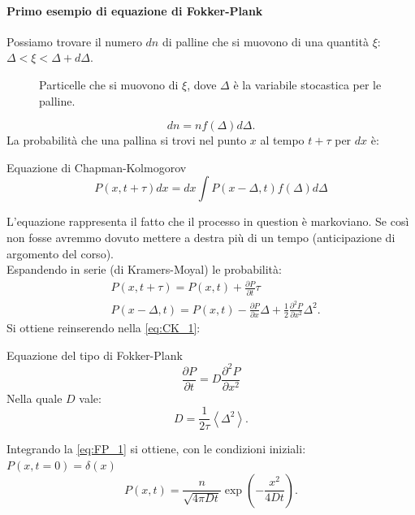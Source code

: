 \paragraph{Primo esempio di equazione di Fokker-Plank}%
Possiamo trovare il numero $dn$ di palline che si muovono di una quantità $\xi$: $\Delta < \xi < \Delta  + d\Delta$.
\begin{figure}[H]
    \centering
    \caption{\scriptsize Particelle che si muovono di $\xi$, dove $\Delta$ è la variabile stocastica per le palline.}
    \label{fig:1-brown}
\end{figure}
\noindent
\[
    dn = n f(\Delta) d\Delta
.\] 
La probabilità che una pallina si trovi nel punto $x$ al tempo $t+\tau$ per $dx$ è:
\begin{greenbox}{Equazione di Chapman-Kolmogorov}
 \begin{equation}
    P(x,t+\tau) dx = dx \int P(x-\Delta,t) f(\Delta) d\Delta \label{eq:CK_1}
\end{equation}
\end{greenbox}
\noindent
L'equazione rappresenta il fatto che il processo in question è markoviano. Se così non fosse avremmo dovuto mettere a destra più di un tempo (anticipazione di argomento del corso).\\
Espandendo in serie (di Kramers-Moyal) le probabilità:
\[\begin{aligned}
    &P(x, t+\tau) = P(x, t) + \frac{\partial P}{\partial t} \tau  \\
    & P(x-\Delta,t) = P(x,t) - \frac{\partial P}{\partial x} \Delta  + \frac{1}{2}\frac{\partial ^2 P}{\partial x^2} \Delta^2
.\end{aligned}\]
Si ottiene reinserendo nella \ref{eq:CK_1}:
\begin{redbox}{Equazione del tipo di Fokker-Plank}
     \begin{equation}
	\frac{\partial P}{\partial t} = D \frac{\partial ^2P}{\partial x^2} \label{eq:FP_1}
    \end{equation}
Nella quale $D$ vale:
\[
    D = \frac{1}{2\tau}\left<\Delta^2\right>
.\]    
\end{redbox}

\noindent
Integrando la \ref{eq:FP_1} si ottiene, con le condizioni iniziali: $P(x,t=0) = \delta(x)$
\[
    P(x,t) = \frac{n}{\sqrt{4\pi Dt}}\exp\left(-\frac{x^2}{4Dt}\right)   
.\] 
